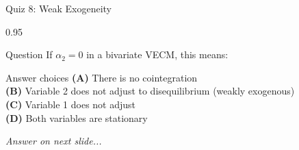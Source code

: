 \documentclass[9pt, aspectratio=169, t]{beamer}
\begin{document}
\begin{frame}{Quiz 8: Weak Exogeneity}
    \begin{cminipage}{0.95\textwidth}
    \begin{alertblock}{Question}
        If $\alpha_2 = 0$ in a bivariate VECM, this means:
    \end{alertblock}

    \vspace{0.4cm}

    \begin{block}{Answer choices}
        \textcolor{MainBlue}{\textbf{(A)}} There is no cointegration\\[3pt]
        \textcolor{MainBlue}{\textbf{(B)}} Variable 2 does not adjust to disequilibrium (weakly exogenous)\\[3pt]
        \textcolor{MainBlue}{\textbf{(C)}} Variable 1 does not adjust\\[3pt]
        \textcolor{MainBlue}{\textbf{(D)}} Both variables are stationary
    \end{block}

    \vspace{0.5cm}

    \begin{center}
        \textit{Answer on next slide...}
    \end{center}
    \end{cminipage}
\end{frame}
\end{document}
